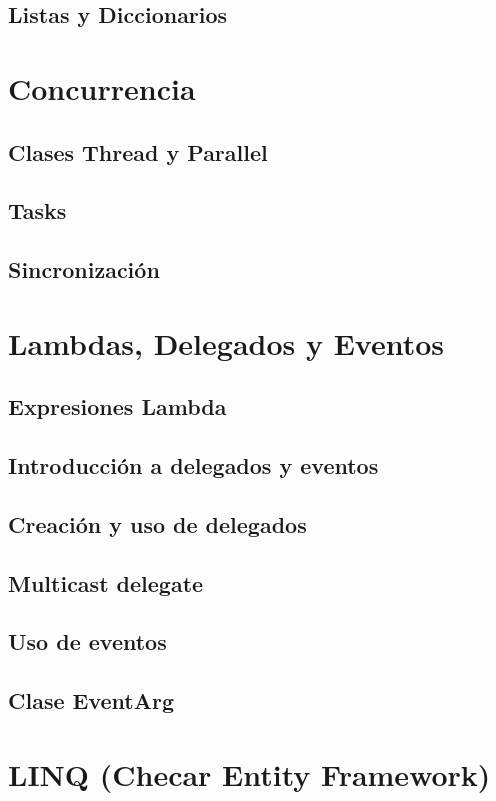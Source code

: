 \documentclass[12pt,a4paper]{report}
\begin{document}
\section{Listas y Diccionarios}

\chapter{Concurrencia}
\section{Clases Thread y Parallel}
\section{Tasks}
\section{Sincronización}

\chapter{Lambdas, Delegados y Eventos}
\section{Expresiones Lambda}
\section{Introducción a delegados y eventos}
\section{Creación y uso de delegados}
\section{Multicast delegate}
\section{Uso de eventos}
\section{Clase EventArg}

\chapter{LINQ (Checar Entity Framework)}
\end{document}
